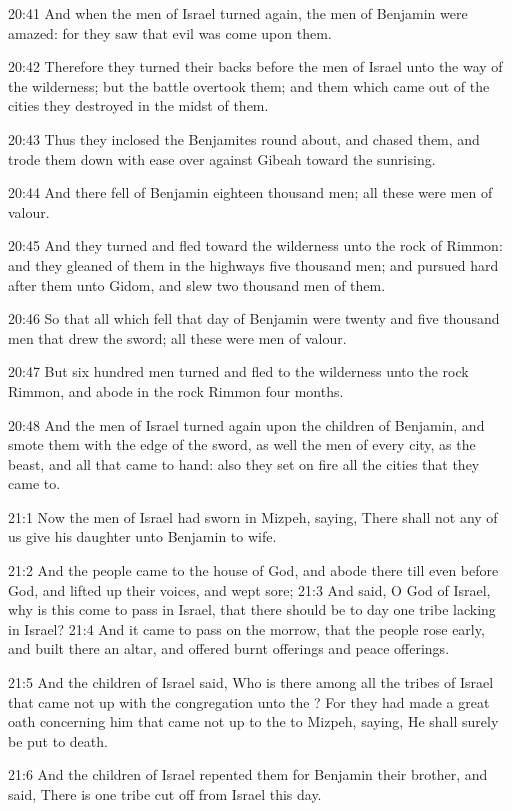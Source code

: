 20:41 And when the men of Israel turned again, the men of Benjamin were amazed: for they saw that evil was come upon them.

20:42 Therefore they turned their backs before the men of Israel unto the way of the wilderness; but the battle overtook them; and them which came out of the cities they destroyed in the midst of them.

20:43 Thus they inclosed the Benjamites round about, and chased them, and trode them down with ease over against Gibeah toward the sunrising.

20:44 And there fell of Benjamin eighteen thousand men; all these were men of valour.

20:45 And they turned and fled toward the wilderness unto the rock of Rimmon: and they gleaned of them in the highways five thousand men; and pursued hard after them unto Gidom, and slew two thousand men of them.

20:46 So that all which fell that day of Benjamin were twenty and five thousand men that drew the sword; all these were men of valour.

20:47 But six hundred men turned and fled to the wilderness unto the rock Rimmon, and abode in the rock Rimmon four months.

20:48 And the men of Israel turned again upon the children of Benjamin, and smote them with the edge of the sword, as well the men of every city, as the beast, and all that came to hand: also they set on fire all the cities that they came to.

21:1 Now the men of Israel had sworn in Mizpeh, saying, There shall not any of us give his daughter unto Benjamin to wife.

21:2 And the people came to the house of God, and abode there till even before God, and lifted up their voices, and wept sore; 21:3 And said, O \LORD God of Israel, why is this come to pass in Israel, that there should be to day one tribe lacking in Israel?  21:4 And it came to pass on the morrow, that the people rose early, and built there an altar, and offered burnt offerings and peace offerings.

21:5 And the children of Israel said, Who is there among all the tribes of Israel that came not up with the congregation unto the \LORD?  For they had made a great oath concerning him that came not up to the \LORD to Mizpeh, saying, He shall surely be put to death.

21:6 And the children of Israel repented them for Benjamin their brother, and said, There is one tribe cut off from Israel this day.

